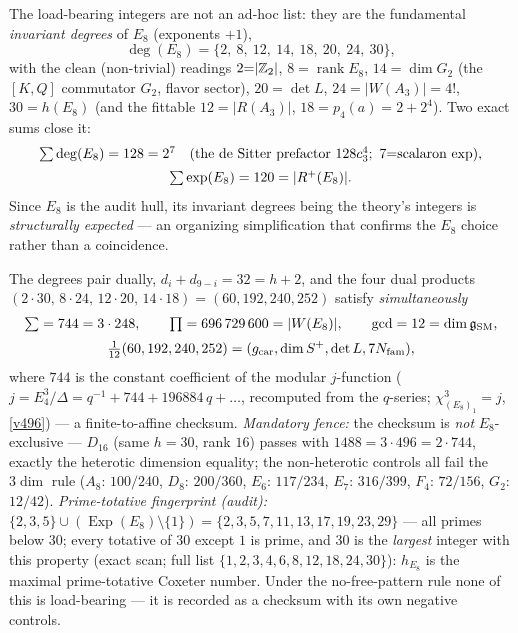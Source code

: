 \begin{keybox}
The load-bearing integers are not an ad-hoc list: they are the fundamental \emph{invariant degrees} of $E_8$
(exponents $+1$),
\[
  \deg(E_8)=\{2,\ 8,\ 12,\ 14,\ 18,\ 20,\ 24,\ 30\},
\]
with the clean (non-trivial) readings $2{=}|\mathbb{Z}_2|$, $8{=}\operatorname{rank}E_8$, $14{=}\dim G_2$ (the $[K,Q]$
commutator $G_2$, flavor sector), $20{=}\det L$, $24{=}|W(A_3)|{=}4!$, $30{=}h(E_8)$ (and the fittable
$12{=}|R(A_3)|$, $18{=}p_4(a){=}2{+}2^4$). Two exact sums close it:
\[
  \begin{gathered}
  \textstyle\sum\deg(E_8)=128=2^{7}\quad(\text{the de Sitter prefactor }128c_3^4;\ 7{=}\text{scalaron exp}),\\[2pt]
  \textstyle\sum\text{exp}(E_8)=120=|R^+(E_8)| .
  \end{gathered}
\]
Since $E_8$ is the audit hull, its invariant degrees being the theory's integers is \emph{structurally
expected} --- an organizing simplification that confirms the $E_8$ choice rather than a coincidence.
\end{keybox}

\begin{keybox}
The degrees pair dually, $d_i+d_{9-i}=32=h+2$, and the four dual products
$(2{\cdot}30,\,8{\cdot}24,\,12{\cdot}20,\,14{\cdot}18)=(60,192,240,252)$ satisfy \emph{simultaneously}
\[
  \begin{gathered}
  \textstyle\sum=744=3\cdot248,\qquad \prod=696\,729\,600=|W(E_8)|,\qquad \gcd=12=\dim\mathfrak g_{\mathrm{SM}},\\[2pt]
  \tfrac1{12}(60,192,240,252)=(g_{\mathrm{car}},\dim S^+,\det L,7N_{\mathrm{fam}}),
  \end{gathered}
\]
where $744$ is the constant coefficient of the modular $j$-function ($j=E_4^3/\Delta=q^{-1}+744+196884\,q+\dots$,
recomputed from the $q$-series; $\chi_{(E_8)_1}^3=j$, \vref{v496}) --- a finite-to-affine checksum.
\emph{Mandatory fence:} the checksum is \emph{not} $E_8$-exclusive --- $D_{16}$ (same $h=30$, rank $16$)
passes with $1488=3\cdot496=2\cdot744$, exactly the heterotic dimension equality; the non-heterotic
controls all fail the $3\dim$ rule ($A_8$: $100/240$, $D_8$: $200/360$, $E_6$: $117/234$, $E_7$: $316/399$,
$F_4$: $72/156$, $G_2$: $12/42$). \emph{Prime-totative fingerprint (audit):}
$\{2,3,5\}\cup(\operatorname{Exp}(E_8)\setminus\{1\})=\{2,3,5,7,11,13,17,19,23,29\}$ --- all primes below
$30$; every totative of $30$ except $1$ is prime, and $30$ is the \emph{largest} integer with this property
(exact scan; full list $\{1,2,3,4,6,8,12,18,24,30\}$): $h_{E_8}$ is the maximal prime-totative Coxeter
number. Under the no-free-pattern rule none of this is load-bearing --- it is recorded as a checksum with
its own negative controls.
\end{keybox}


